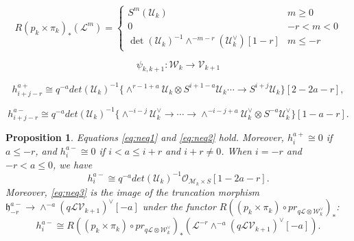 \documentclass[10pt,a4paper]{amsart}
\newtheorem{proposition}{Proposition}
\newcommand\mc{\mathcal}
\newcommand\mf{\mathfrak}
\begin{document}
  \begin{equation}
      \label{cor:5.3ext}
     R(p_{k}\times \pi_{k})_{*}(\mc{L}^{m})=
     \begin{cases}
       S^{m}(\mc{U}_{k}) & m\geq 0 \\
       0 & -r<m<0 \\
     \det(\mc{U}_{k})^{-1}\wedge^{-m-r}(\mc{U}_{k}^{\vee})[1-r] & m\leq -r
     \end{cases}
   \end{equation}

\begin{equation}
  \label{psik}
  \psi_{k,k+1}:\mc{W}_{k}\to \mc{V}_{k+1}
\end{equation}

    \begin{equation}
    \label{eq:neq1}
    h_{i+j-r}^{a+}\cong q^{-a}det(\mc{U}_{k})^{-1}\{\wedge^{r-1+a}\mc{U}_{k}\otimes S^{i+1-a}\mc{U}_{k}\cdots \to S^{i+j}\mc{U}_{k}\}[2-2a-r],
  \end{equation}

  \begin{equation}
    \label{eq:neq2}
    h_{i+j-r}^{a-}\cong q^{-a}det(\mc{U}_{k})^{-1}\{\wedge^{-i-j}\mc{U}_{k}^{\vee}\to \cdots \to \wedge^{-i-j+a}\mc{U}_{k}^{\vee}\otimes S^{-a}\mc{U}_{k}^{\vee}\}[1-a-r]. 
  \end{equation}

\begin{proposition}
  \label{lcor} \label{n54} \label{n56} Equations \cref{eq:neq1} and \cref{eq:neq2} hold. Moreover, $h_{i}^{a+}\cong0$ if $a\leq -r$, and $h_{i}^{a-}\cong0$ if $i<a\leq i+r$ and $i+r\neq 0$. When $i=-r$ and $-r<a\leq 0$, we have
  \begin{equation}
    \label{eq:neq3}
   h_{i}^{a-}\cong q^{-a}det(\mc{U}_{k})^{-1}\mc{O}_{\mc{M}_{k}\times S}[1-2a-r].
 \end{equation}
 Moreover, \cref{eq:neq3} is the image of the truncation morphism $\mf{h}_{-r}^{a-}\to \wedge^{-a}(q\mc{L}\mc{V}_{k+1})^{\vee}[-a]$ under the functor $R((p_{k}\times \pi_{k})\circ pr_{q\mc{L}\otimes \mc{W}_{k}^{\vee}})_{*}$:
 \begin{equation}
   \label{eq:4115}
    h_{i}^{a-}\cong R((p_{k}\times \pi_{k})\circ pr_{q\mc{L}\otimes \mc{W}_{k}^{\vee}})_{*}(\mc{L}^{-r}\wedge^{-a}(q\mc{L}\mc{V}_{k+1})^{\vee}[-a]).
 \end{equation}
\end{proposition}
\end{document}
